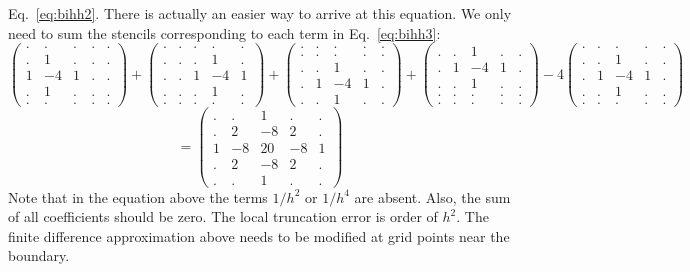 Eq.~\eqref{eq:bihh2}. There is actually an easier way to arrive at this equation. We only need to 
sum the stencils corresponding to each term in Eq.~\eqref{eq:bihh3}:
{\small
\[
\begin{pmatrix}
 . &  . & . & . &.\\
 . &  1 & . & . &.\\
 1 & -4 & 1 & . &.\\
 . &  1 & . & . &.\\
 . &  . & . & . &.
\end{pmatrix}
+
\begin{pmatrix}
.&. & . &  . & .  \\
.&. & . &  1 & .  \\
.&. & 1 & -4 & 1  \\
.&. & . &  1 & .  \\
.&. & . &  . & .  
\end{pmatrix}
+
\begin{pmatrix}
. & . &  . & . & .  \\
. & . &  . & . & . \\
. & . &  1 & . & . \\
. & 1 & -4 & 1 & . \\
. & . &  1 & . & . 
\end{pmatrix}
+
\begin{pmatrix}
. & . &  1 & . & . \\
. & 1 & -4 & 1 & . \\
. & . &  1 & . & . \\
. & . &  . & . & . \\
. & . &  . & . & . 
\end{pmatrix}
-4
\begin{pmatrix}
. & . &  . & . & . \\
. & . &  1 & . & . \\
. & 1 & -4 & 1 & . \\
. & . &  1 & . & . \\
. & . &  . & . & . 
\end{pmatrix}
\]
\[
=
\begin{pmatrix}
. & . &  1 & . & . \\
. & 2 &  -8 & 2 & . \\
1 & -8 & 20 & -8 & 1 \\
. & 2 &  -8 & 2 & . \\
. & . &  1 & . & . 
\end{pmatrix}
\]
}
Note that in the equation above the terms $1/h^2$ or $1/h^4$ are absent.
Also, the sum of all coefficients should be zero. 
The local truncation error is order of $h^2$. The finite difference approximation above needs to be modified at grid points near the boundary. 

